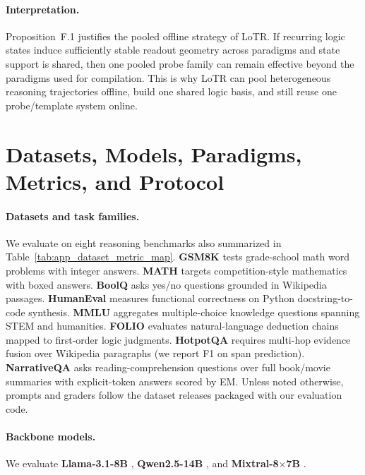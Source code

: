 \paragraph{Interpretation.}
Proposition~F.1 justifies the pooled offline strategy of LoTR. If recurring logic states induce sufficiently stable readout geometry across paradigms and state support is shared, then one pooled probe family can remain effective beyond the paradigms used for compilation. This is why LoTR can pool heterogeneous reasoning trajectories offline, build one shared logic basis, and still reuse one probe/template system online.

\clearpage
{}

\section{Datasets, Models, Paradigms, Metrics, and Protocol}
\label{app:exp_setup}

\paragraph{Datasets and task families.}
We evaluate on eight reasoning benchmarks also summarized in Table~\ref{tab:app_dataset_metric_map}.
\textbf{GSM8K} \citep{cobbe2021gsm8k} tests grade-school math word problems with integer answers.
\textbf{MATH} \citep{hendrycks2021math} targets competition-style mathematics with boxed answers.
\textbf{BoolQ} \citep{clark2019boolq} asks yes/no questions grounded in Wikipedia passages.
\textbf{HumanEval} \citep{chen2021evaluating} measures functional correctness on Python docstring-to-code synthesis.
\textbf{MMLU} \citep{hendrycks2021mathmassive} aggregates multiple-choice knowledge questions spanning STEM and humanities.
\textbf{FOLIO} \citep{han2022folio} evaluates natural-language deduction chains mapped to first-order logic judgments.
\textbf{HotpotQA} \citep{yang2018hotpotqa} requires multi-hop evidence fusion over Wikipedia paragraphs (we report F1 on span prediction).
\textbf{NarrativeQA} \citep{kocisky2018narrativeqa} asks reading-comprehension questions over full book/movie summaries with explicit-token answers scored by EM.
Unless noted otherwise, prompts and graders follow the dataset releases packaged with our evaluation code.

\paragraph{Backbone models.}
We evaluate \textbf{Llama-3.1-8B} \citep{grattafiori2024llama3}, \textbf{Qwen2.5-14B} \citep{yang2024qwen25}, and \textbf{Mixtral-8$\times$7B} \citep{jiang2024mixtral}.

